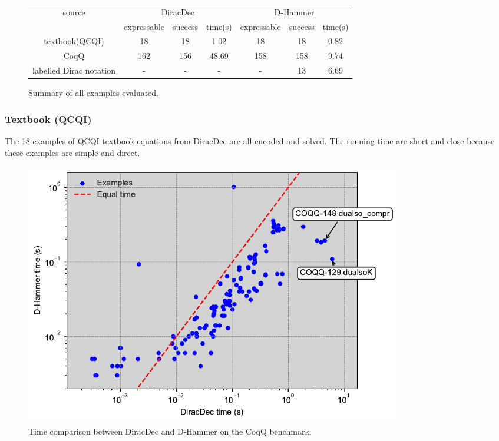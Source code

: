 \begin{figure}[h]
    \center
    \begin{tabular}{c|c c c|c c c}
        \hline
        \multirow{2}{*}{source} & \multicolumn{3}{c|}{DiracDec} & \multicolumn{3}{c}{D-Hammer} \\
        \cline{2-7}
                                 & expressable & success & time(s)           & expressable & success & time(s)                 \\
        \hline
        textbook(QCQI)          & 18          & 18        &    1.02        &    18      & 18          &   0.82      \\
        CoqQ                    & 162          & 156       &    48.69       &   158     &  158   &     9.74     \\
        labelled Dirac notation      &   -         &   -          &     -           &      -      &        13       &     6.69    \\
        \hline
    \end{tabular}        
    \caption{Summary of all examples evaluated.}
    \label{fig: all examples}
\end{figure}

\subsubsection{Textbook (QCQI)}
The 18 examples of QCQI textbook equations from DiracDec are all encoded and solved. The running time are short and close because these examples are simple and direct.


\begin{figure}[h]
    \centering
    \includegraphics[width=0.8\textwidth]{fig/coqq.pdf}
    \caption{Time comparison between DiracDec and D-Hammer on the CoqQ benchmark.}
    \label{fig: CoqQ plot}
\end{figure}

